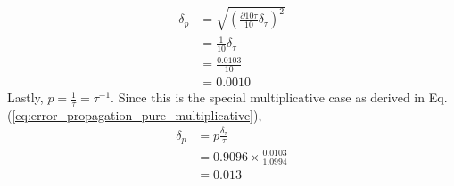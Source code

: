 \begin{align*}
    \delta_p &= \sqrt{\left(\frac{\partial 10 \tau}{10} \delta_{\tau}\right)^2} \\
    &= \frac{1}{10} \delta_{\tau} \\
    &= \frac{0.0103}{10} \\
    &= \boxed{0.0010}
\end{align*}
Lastly, $p = \frac{1}{\tau} = \tau^{-1}$. Since this is the special multiplicative case as derived in Eq. (\ref{eq:error_propagation_pure_multiplicative}),
\begin{align*}
    \delta_p &= p \frac{\delta_{\tau}}{\tau} \\
    &= 0.9096 \times \frac{0.0103}{1.0994} \\
    &= \boxed{0.013}
\end{align*}